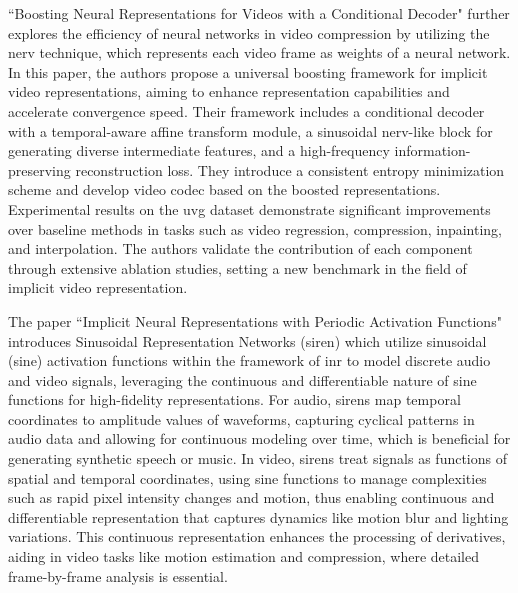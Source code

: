 \documentclass{ioereport}
\begin{document}
``Boosting Neural Representations for Videos with a Conditional Decoder" \cite{zhang2024boosting} further explores the efficiency of neural networks in video compression by utilizing the \gls{nerv} technique, which represents each video frame as weights of a neural network. In this paper, the authors propose a universal boosting framework for implicit video representations, aiming to enhance representation capabilities and accelerate convergence speed. Their framework includes a conditional decoder with a temporal-aware affine transform module, a sinusoidal \gls{nerv}-like block for generating diverse intermediate features, and a high-frequency information-preserving reconstruction loss. They introduce a consistent entropy minimization scheme and develop video \gls{codec} based on the boosted representations. Experimental results on the \gls{uvg} dataset demonstrate significant improvements over baseline methods in tasks such as video regression, compression, inpainting, and interpolation. The authors validate the contribution of each component through extensive ablation studies, setting a new benchmark in the field of implicit video representation.

The paper ``Implicit Neural Representations with Periodic Activation Functions" \cite{sitzmann2020implicit} introduces Sinusoidal Representation Networks (\gls{siren}) which utilize sinusoidal (sine) activation functions within the framework of \gls{inr} to model discrete audio and video signals, leveraging the continuous and differentiable nature of sine functions for high-fidelity representations. For audio, \gls{siren}s map temporal coordinates to amplitude values of waveforms, capturing cyclical patterns in audio data and allowing for continuous modeling over time, which is beneficial for generating synthetic speech or music. In video, \gls{siren}s treat signals as functions of spatial and temporal coordinates, using sine functions to manage complexities such as rapid pixel intensity changes and motion, thus enabling continuous and differentiable representation that captures dynamics like motion blur and lighting variations. This continuous representation enhances the processing of derivatives, aiding in video tasks like motion estimation and compression, where detailed frame-by-frame analysis is essential.
\end{document}
